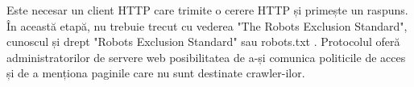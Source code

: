 Este necesar un client HTTP care trimite o cerere HTTP și primește un raspuns. În această etapă, nu trebuie trecut cu vederea "The Robots Exclusion Standard", cunoscul și drept "Robots Exclusion Standard" sau robots.txt \cite{RobotsStandard}. Protocolul oferă administratorilor de servere web posibilitatea de a-și comunica politicile de acces și de a menționa paginile care nu sunt destinate crawler-ilor.
\\
